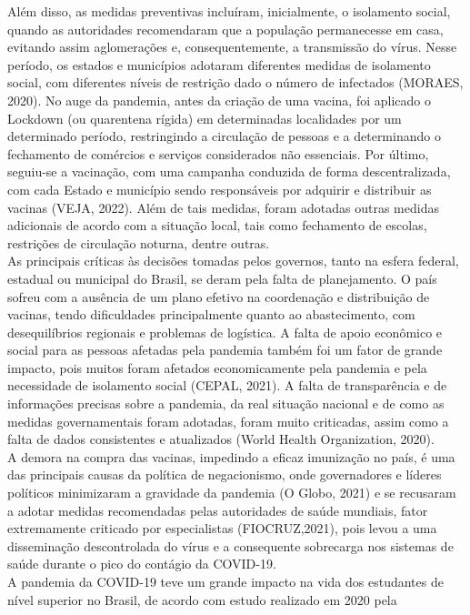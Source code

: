\documentclass[
]{article}
\begin{document}
Além disso, as medidas preventivas incluíram, inicialmente, o isolamento
social, quando as autoridades recomendaram que a população permanecesse
em casa, evitando assim aglomerações e, consequentemente, a transmissão
do vírus. Nesse período, os estados e municípios adotaram diferentes
medidas de isolamento social, com diferentes níveis de restrição dado o
número de infectados (MORAES, 2020). No auge da pandemia, antes da
criação de uma vacina, foi aplicado o Lockdown (ou quarentena rígida) em
determinadas localidades por um determinado período, restringindo a
circulação de pessoas e a determinando o fechamento de comércios e
serviços considerados não essenciais. Por último, seguiu-se a vacinação,
com uma campanha conduzida de forma descentralizada, com cada Estado e
município sendo responsáveis por adquirir e distribuir as vacinas (VEJA,
2022). Além de tais medidas, foram adotadas outras medidas adicionais de
acordo com a situação local, tais como fechamento de escolas, restrições
de circulação noturna, dentre outras.\\
As principais críticas às decisões tomadas pelos governos, tanto na
esfera federal, estadual ou municipal do Brasil, se deram pela falta de
planejamento. O país sofreu com a ausência de um plano efetivo na
coordenação e distribuição de vacinas, tendo dificuldades principalmente
quanto ao abastecimento, com desequilíbrios regionais e problemas de
logística. A falta de apoio econômico e social para as pessoas afetadas
pela pandemia também foi um fator de grande impacto, pois muitos foram
afetados economicamente pela pandemia e pela necessidade de isolamento
social (CEPAL, 2021). A falta de transparência e de informações precisas
sobre a pandemia, da real situação nacional e de como as medidas
governamentais foram adotadas, foram muito criticadas, assim como a
falta de dados consistentes e atualizados (World Health Organization,
2020).\\
A demora na compra das vacinas, impedindo a eficaz imunização no país, é
uma das principais causas da política de negacionismo, onde governadores
e líderes políticos minimizaram a gravidade da pandemia (O Globo, 2021)
e se recusaram a adotar medidas recomendadas pelas autoridades de saúde
mundiais, fator extremamente criticado por especialistas (FIOCRUZ,2021),
pois levou a uma disseminação descontrolada do vírus e a consequente
sobrecarga nos sistemas de saúde durante o pico do contágio da
COVID-19.\\
A pandemia da COVID-19 teve um grande impacto na vida dos estudantes de
nível superior no Brasil, de acordo com estudo realizado em 2020 pela
\end{document}
